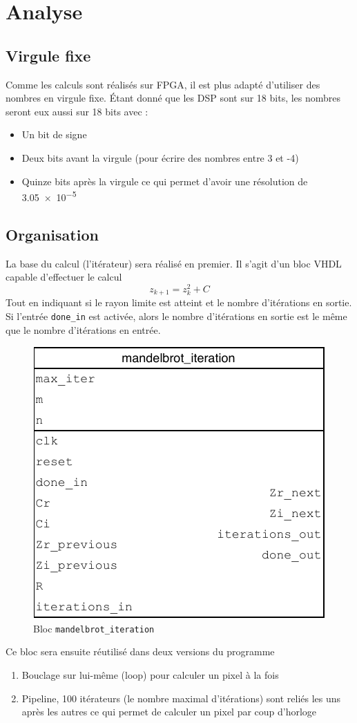 \documentclass[LPSC_Labo03_SDeriaz]{subfiles}
\begin{document}
\section{Analyse}
\subsection{Virgule fixe}
Comme les calculs sont réalisés sur FPGA, il est plus adapté d'utiliser des nombres en virgule fixe. Étant donné que les DSP sont sur 18 bits, les nombres seront eux aussi sur 18 bits avec :
\begin{itemize}
\item Un bit de signe
\item Deux bits avant la virgule (pour écrire des nombres entre 3 et -4)
\item Quinze bits après la virgule ce qui permet d'avoir une résolution de \num{3.05e-5}
\end{itemize}
\subsection{Organisation}
La base du calcul (l'itérateur) sera réalisé en premier. Il s'agit d'un bloc VHDL capable d'effectuer le calcul
$$z_{k+1}=z_{k}^2+C$$
Tout en indiquant si le rayon limite est atteint et le nombre d'itérations en sortie. Si l'entrée \verb!done_in! est activée, alors le nombre d'itérations en sortie est le même que le nombre d'itérations en entrée.
\begin{figure}[H]
\centering
\includegraphics[scale=0.75,page=1]{../Documents/Schemas-crop.pdf}
\caption[caption]{Bloc \texttt{mandelbrot\_iteration}}
\end{figure}
Ce bloc sera ensuite réutilisé dans deux versions du programme
\begin{enumerate}
\item Bouclage sur lui-même (loop) pour calculer un pixel à la fois
\item Pipeline, 100 itérateurs (le nombre maximal d'itérations) sont reliés les uns après les autres ce qui permet de calculer un pixel par coup d'horloge
\end{enumerate}
\end{document}

